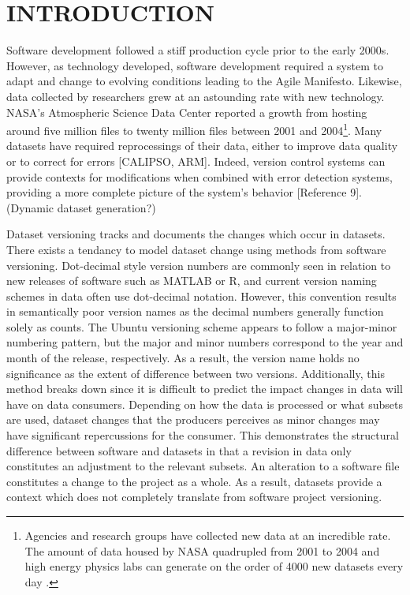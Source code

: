 
\chapter{INTRODUCTION}

Software development followed a stiff production cycle prior to the early 2000s.  However, as technology developed, software development required a system to adapt and change to evolving conditions leading to the Agile Manifesto.  Likewise, data collected by researchers grew at an astounding rate with new technology.  NASA's Atmospheric Science Data Center reported a growth from hosting around five million files to twenty million files between 2001 and 2004\footnote{Agencies and research groups have collected new data at an incredible rate.  The amount of data housed by NASA quadrupled from 2001 to 2004 \cite{barkstromLibrary} and high energy physics labs can generate on the order of 4000 new datasets every day \cite{ATLAS}.}.  Many datasets have required reprocessings of their data, either to improve data quality or to correct for errors [CALIPSO, ARM].  Indeed, version control systems can provide contexts for modifications when combined with error detection systems, providing a more complete picture of the system's behavior [Reference 9].  (Dynamic dataset generation?)

Dataset versioning tracks and documents the changes which occur in datasets.  There exists a tendancy to model dataset change using methods from software versioning.  Dot-decimal style version numbers are commonly seen in relation to new releases of software such as MATLAB or R, and current version naming schemes in data often use dot-decimal notation.  However, this convention results in semantically poor version names as the decimal numbers generally function solely as counts.  The Ubuntu versioning scheme appears to follow a major-minor numbering pattern, but the major and minor numbers correspond to the year and month of the release, respectively.  As a result, the version name holds no significance as the extent of difference between two versions.  Additionally, this method breaks down since it is difficult to predict the impact changes in data will have on data consumers.  Depending on how the data is processed or what subsets are used, dataset changes that the producers perceives as minor changes may have significant repercussions for the consumer.  This demonstrates the structural difference between software and datasets in that a revision in data only constitutes an adjustment to the relevant subsets.  An alteration to a software file constitutes a change to the project as a whole.  As a result, datasets provide a context which does not completely translate from software project versioning.

